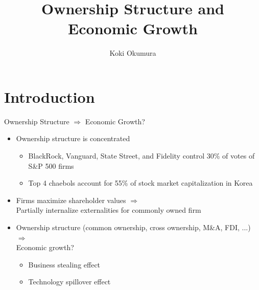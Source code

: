 \documentclass[
  10pt,
  aspectratio=169,   %
]{beamer}
\title{Ownership Structure and Economic Growth}
\author{Koki Okumura}
\institute{UCLA}
\date{}
\theoremstyle{plain}
\begin{document}
\begin{frame}
  \titlepage
\end{frame}

\section{Introduction}

\begin{frame}{Ownership Structure $\Longrightarrow$ Economic Growth?}
  \label{intro} %
  \begin{itemize}
    \item Ownership structure is concentrated \hfill \hyperlink{share}{}
    \begin{itemize}
      \item BlackRock, Vanguard, State Street, and Fidelity control 30\% of votes of S\&P 500 firms
      \item Top 4 chaebols account for 55\% of stock market capitalization in Korea
    \end{itemize}
    \medskip{} \pause
    \item Firms maximize shareholder values $\Longrightarrow$ \\
          Partially internalize externalities for commonly owned firm
    \medskip{} \pause
    \item Ownership structure (common ownership, cross ownership, M\&A, FDI, ...) $\Longrightarrow$ \\
          Economic growth?
    \begin{itemize}
      \item Business stealing effect
      \item Technology spillover effect
    \end{itemize}
  \end{itemize}
\end{frame}
\end{document}
